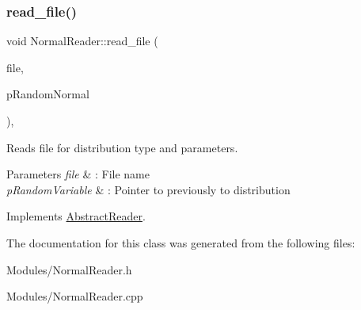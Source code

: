 \subsubsection{\texorpdfstring{read\+\_\+file()}{read\_file()}}
{\footnotesize\ttfamily void Normal\+Reader\+::read\+\_\+file (\begin{DoxyParamCaption}\item[{const char $\ast$}]{file,  }\item[{\hyperlink{classAbstractVariable}{Abstract\+Variable} $\ast$\&}]{p\+Random\+Normal }\end{DoxyParamCaption})\hspace{0.3cm}{\ttfamily [override]}, {\ttfamily [virtual]}}



Reads file for distribution type and parameters. 


\begin{DoxyParams}{Parameters}
{\em file} & \+: File name \\
\hline
{\em p\+Random\+Variable} & \+: Pointer to previously to distribution \\
\hline
\end{DoxyParams}


Implements \hyperlink{classAbstractReader_a01d009f3633d0af6d9ea8e34defda7f5}{Abstract\+Reader}.



The documentation for this class was generated from the following files\+:\begin{DoxyCompactItemize}
\item 
Modules/Normal\+Reader.\+h\item 
Modules/Normal\+Reader.\+cpp\end{DoxyCompactItemize}

